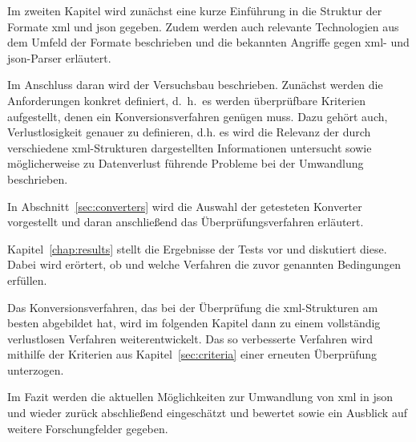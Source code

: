 Im zweiten Kapitel wird zunächst eine kurze Einführung in die Struktur der Formate \acrshort{xml} und \acrshort{json} gegeben. Zudem werden auch relevante Technologien aus dem Umfeld der Formate beschrieben und die bekannten Angriffe gegen \acrshort{xml}- und \acrshort{json}-Parser erläutert.

Im Anschluss daran wird der Versuchsbau beschrieben. Zunächst werden die Anforderungen konkret definiert, d.~h.\ es werden
überprüfbare Kriterien aufgestellt, denen ein Konversionsverfahren genügen
muss. Dazu gehört auch, Verlustlosigkeit genauer zu definieren, d.h.
es wird die Relevanz der durch verschiedene \acrshort{xml}-Strukturen dargestellten
Informationen untersucht sowie möglicherweise zu Datenverlust führende
Probleme bei der Umwandlung beschrieben.

In Abschnitt~\ref{sec:converters} wird die Auswahl der getesteten Konverter vorgestellt und daran anschließend das Überprüfungsverfahren erläutert.

Kapitel~\ref{chap:results} stellt die Ergebnisse der Tests vor und diskutiert diese.
Dabei wird erörtert, ob und welche Verfahren die zuvor genannten Bedingungen
erfüllen.

Das Konversionsverfahren, das bei der Überprüfung die \acrshort{xml}-Strukturen am besten abgebildet hat, wird im folgenden Kapitel dann zu einem vollständig verlustlosen Verfahren weiterentwickelt. Das so verbesserte Verfahren wird mithilfe der Kriterien aus Kapitel~\ref{sec:criteria} einer erneuten Überprüfung unterzogen.

Im Fazit werden die aktuellen Möglichkeiten zur Umwandlung
von \acrshort{xml} in \acrshort{json} und wieder zurück abschließend eingeschätzt und bewertet sowie ein Ausblick auf weitere Forschungfelder gegeben.
